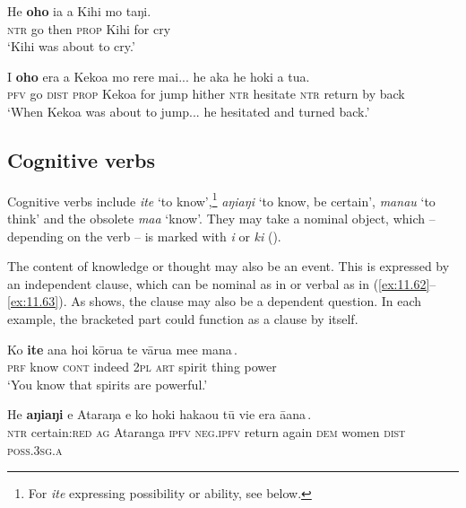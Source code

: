 \ea\label{ex:11.59}
\gll He \textbf{oho} ia a Kihi mo taŋi.\\
\textsc{ntr} go then \textsc{prop} Kihi for cry\\

\glt 
‘Kihi was about to cry.’ \textstyleExampleref{[R215.024]} 
\z

\ea\label{ex:11.60}
\gll I \textbf{oho} era a Kekoa mo rere mai... he {\ꞌ}aka he hoki a tu{\ꞌ}a. \\
\textsc{pfv} go \textsc{dist} \textsc{prop} Kekoa for jump hither \textsc{ntr} hesitate \textsc{ntr} return by back \\

\glt 
‘When Kekoa was about to jump... he hesitated and turned back.’ \textstyleExampleref{[R108.010]}\textstyleExampleref{} 
\z

\subsection{Cognitive verbs}\label{sec:11.3.3}
Cognitive verbs include \textit{{\ꞌ}ite} ‘to know’,\footnote{\label{fn:507}For \textit{{\ꞌ}ite} expressing possibility or ability, see  below.} \textit{aŋiaŋi} ‘to know, be certain’, \textit{mana{\ꞌ}u} ‘to think’ and the obsolete \textit{ma{\ꞌ}a} ‘know’. They may take a nominal object, which – depending on the verb – is marked with \textit{i} or \textit{ki} ().

The content of knowledge or thought may also be an event. This is expressed by an independent clause, which can be nominal as in  or verbal as in (\ref{ex:11.62}–\ref{ex:11.63}). As  shows, the clause may also be a dependent question. In each example, the bracketed part could function as a clause by itself.

\ea\label{ex:11.61}
\gll Ko \textbf{{\ꞌ}ite} {\ꞌ}ana ho{\ꞌ}i kōrua {\ob}te vārua me{\ꞌ}e mana\,{\cb}. \\
\textsc{prf} know \textsc{cont} indeed \textsc{2pl} {\db}\textsc{art} spirit thing power \\

\glt 
‘You know that spirits are powerful.’ \textstyleExampleref{[R310.023]} 
\z

\ea\label{ex:11.62}
\gll He \textbf{aŋiaŋi} e Ataraŋa {\ob}e ko hoki haka{\ꞌ}ou tū vi{\ꞌ}e era {\ꞌ}ā{\ꞌ}ana\,{\cb}.\\
\textsc{ntr} certain:\textsc{red} \textsc{ag} Ataranga {\db}\textsc{ipfv} \textsc{neg.ipfv} return again \textsc{dem} women \textsc{dist} \textsc{poss.3sg.a}\\

